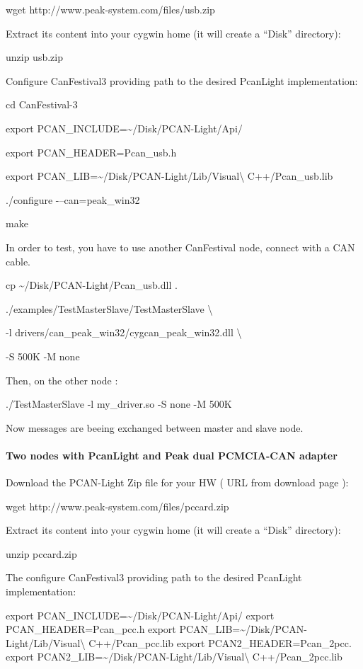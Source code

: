 \documentclass[12pt,twoside]{article}
\begin{document}
{\ttfamily
wget http://www.peak{}-system.com/files/usb.zip}

Extract its content into your cygwin home (it will create a ``Disk''
directory):

{\ttfamily
unzip usb.zip}

Configure CanFestival3 providing path to the desired PcanLight
implementation:

{\ttfamily
cd CanFestival{}-3}

{\ttfamily
export PCAN\_INCLUDE=\~{}/Disk/PCAN{}-Light/Api/}

{\ttfamily
export PCAN\_HEADER=Pcan\_usb.h}

{\ttfamily
export PCAN\_LIB=\~{}/Disk/PCAN{}-Light/Lib/Visual{\textbackslash}
C++/Pcan\_usb.lib}

{\ttfamily
./configure {}-{--}can=peak\_win32}

{\ttfamily
make}

In order to test, you have to use another CanFestival node, connect with
a CAN cable.

{\ttfamily
cp \~{}/Disk/PCAN{}-Light/Pcan\_usb.dll .}

{\ttfamily
./examples/TestMasterSlave/TestMasterSlave {\textbackslash}}

{\ttfamily
  {}-l drivers/can\_peak\_win32/cygcan\_peak\_win32.dll
{\textbackslash}}

{\ttfamily
  {}-S 500K {}-M none}

Then, on the other node :

{\ttfamily
./TestMasterSlave {}-l my\_driver.so {}-S none {}-M 500K}

Now messages are beeing exchanged between master and slave node.

\paragraph{Two nodes with PcanLight and Peak dual PCMCIA{}-CAN adapter}
Download the PCAN{}-Light Zip file for your HW ( URL from download page
): 

{\ttfamily
wget http://www.peak{}-system.com/files/pccard.zip}

Extract its content into your cygwin home (it will create a ``Disk''
directory):

{\ttfamily
unzip pccard.zip}

The configure CanFestival3 providing path to the desired PcanLight
implementation:

{\ttfamily
export PCAN\_INCLUDE=\~{}/Disk/PCAN{}-Light/Api/\newline
export PCAN\_HEADER=Pcan\_pcc.h\newline
export PCAN\_LIB=\~{}/Disk/PCAN{}-Light/Lib/Visual{\textbackslash}
C++/Pcan\_pcc.lib\newline
export PCAN2\_HEADER=Pcan\_2pcc.\newline
export PCAN2\_LIB=\~{}/Disk/PCAN{}-Light/Lib/Visual{\textbackslash}
C++/Pcan\_2pcc.lib}
\end{document}
